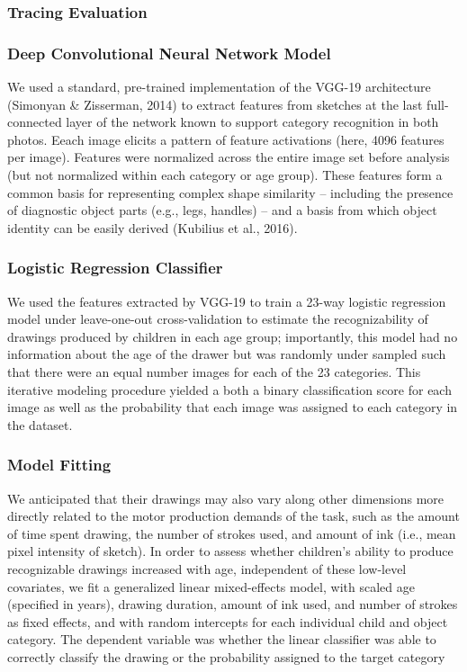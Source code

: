 \documentclass[10pt, letterpaper]{article}
\begin{document}
\subsubsection{Tracing Evaluation}\label{tracing-evaluation}

\subsubsection{Deep Convolutional Neural Network
Model}\label{deep-convolutional-neural-network-model}

We used a standard, pre-trained implementation of the VGG-19
architecture (Simonyan \& Zisserman, 2014) to extract features from
sketches at the last full-connected layer of the network known to
support category recognition in both photos. Eeach image elicits a
pattern of feature activations (here, 4096 features per image). Features
were normalized across the entire image set before analysis (but not
normalized within each category or age group). These features form a
common basis for representing complex shape similarity -- including the
presence of diagnostic object parts (e.g., legs, handles) -- and a basis
from which object identity can be easily derived (Kubilius et al.,
2016).

\subsubsection{Logistic Regression
Classifier}\label{logistic-regression-classifier}

We used the features extracted by VGG-19 to train a 23-way logistic
regression model under leave-one-out cross-validation to estimate the
recognizability of drawings produced by children in each age group;
importantly, this model had no information about the age of the drawer
but was randomly under sampled such that there were an equal number
images for each of the 23 categories. This iterative modeling procedure
yielded a both a binary classification score for each image as well as
the probability that each image was assigned to each category in the
dataset.

\subsubsection{Model Fitting}\label{model-fitting}

We anticipated that their drawings may also vary along other dimensions
more directly related to the motor production demands of the task, such
as the amount of time spent drawing, the number of strokes used, and
amount of ink (i.e., mean pixel intensity of sketch). In order to assess
whether children's ability to produce recognizable drawings increased
with age, independent of these low-level covariates, we fit a
generalized linear mixed-effects model, with scaled age (specified in
years), drawing duration, amount of ink used, and number of strokes as
fixed effects, and with random intercepts for each individual child and
object category. The dependent variable was whether the linear
classifier was able to correctly classify the drawing or the probability
assigned to the target category
\end{document}
